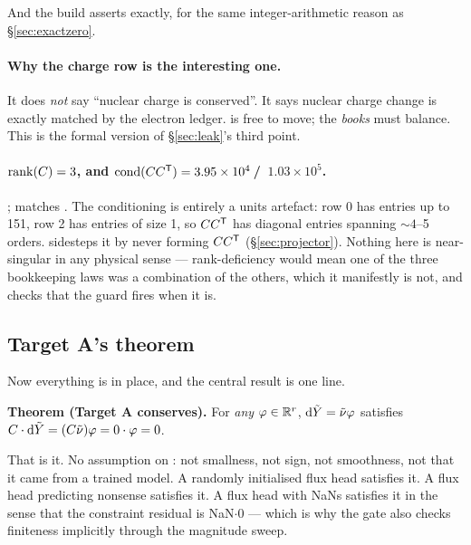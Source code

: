 And the build asserts  exactly, for the same
integer-arithmetic reason as \S\ref{sec:exactzero}.

\paragraph{Why the charge row is the interesting one.} It does \emph{not} say
``nuclear charge is conserved''. It says nuclear charge change is exactly
matched by the electron ledger. \Ye{} is free to move; the \emph{books} must
balance. This is the formal version of \S\ref{sec:leak}'s third point.

\paragraph{$\operatorname{rank}(C) = 3$, and $\operatorname{cond}(CC^{\mathsf{T}}) = 3.95\times10^{4}$\,/\,%
$1.03\times10^{5}$.} \derivedhere; matches . The
conditioning is entirely a units artefact: row 0 has entries up to 151, row 2
has entries of size 1, so $CC^{\mathsf{T}}$ has diagonal entries spanning ${\sim}4$--5
orders.  sidesteps it by never forming $CC^{\mathsf{T}}$
(\S\ref{sec:projector}). Nothing here is near-singular in any physical sense ---
rank-deficiency would mean one of the three bookkeeping laws was a combination
of the others, which it manifestly is not, and
 checks that the guard fires
when it is.

\subsection{Target A's theorem}
\label{sec:targetatheorem}

Now everything is in place, and the central result is one line.

\begin{invariant}
\textbf{Theorem (Target A conserves).} For \emph{any} $\varphi \in
\mathbb{R}^r$, $\mathrm{d}\tilde Y = \tilde\nu\varphi$ satisfies
$C\cdot \mathrm{d}\tilde Y = (C\tilde\nu)\varphi = 0\cdot\varphi = 0$.
\end{invariant}

That is it. No assumption on \netflux: not smallness, not sign, not smoothness,
not that it came from a trained model. A randomly initialised flux head
satisfies it. A flux head predicting nonsense satisfies it. A flux head with
NaNs satisfies it in the sense that the constraint residual is NaN$\cdot$0 ---
which is why the gate also checks finiteness implicitly through the magnitude
sweep.

